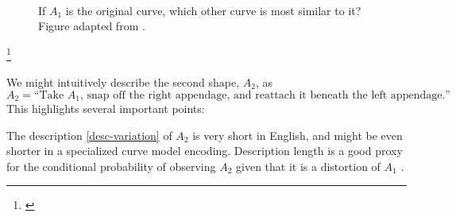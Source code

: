 \begin{figure}
  \centering
{}
\\
\caption{If $A_1$ is the original curve, which other curve is most
  similar to it? Figure adapted from .}
\label{fig-variation}
\end{figure}
\footnote{\cite{basri-jacobs}}

We might intuitively describe the second shape, $A_2$, as
$$ A_2 =\mbox{``Take $A_1$, snap off the right appendage, and reattach
  it beneath the left appendage.''}. \label{desc-variation}$$ 
This highlights several important points:

The description \ref{desc-variation} of $A_2$ is very short in
English, and might be even shorter in a specialized curve model
encoding. Description length is a good proxy for the conditional
probability of observing $A_2$ given that it is a distortion of $A_1$
\cite{potter-geman-bienenstock}.

